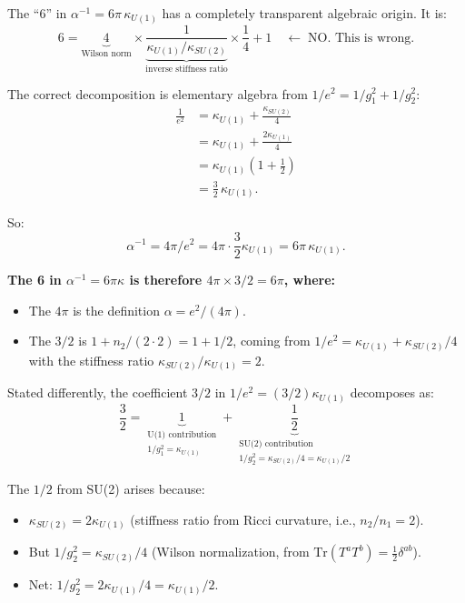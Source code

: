 \documentclass[11pt]{article}
\begin{document}
The ``6'' in $\alpha^{-1} = 6\pi\,\kappa_{U(1)}$ has a completely
transparent algebraic origin.  It is:
\begin{equation}
6 = \underbrace{4}_{\text{Wilson norm}}
    \times \underbrace{\frac{1}{\kappa_{U(1)}/\kappa_{SU(2)}}}_{\text{inverse
    stiffness ratio}}
    \times \frac{1}{4}
    + 1
    \quad\longleftarrow\;\text{NO.  This is wrong.}
\end{equation}

The correct decomposition is elementary algebra from
$1/e^2 = 1/g_1^2 + 1/g_2^2$:
\begin{align}
\frac{1}{e^2}
&= \kappa_{U(1)} + \frac{\kappa_{SU(2)}}{4} \nonumber\\
&= \kappa_{U(1)} + \frac{2\kappa_{U(1)}}{4} \nonumber\\
&= \kappa_{U(1)}\!\left(1 + \frac{1}{2}\right) \nonumber\\
&= \frac{3}{2}\,\kappa_{U(1)}.
\end{align}

So:
\[
\alpha^{-1} = 4\pi/e^2 = 4\pi \cdot \frac{3}{2}\kappa_{U(1)}
= 6\pi\,\kappa_{U(1)}.
\]

\textbf{The 6 in $\alpha^{-1} = 6\pi\kappa$ is therefore
$4\pi \times 3/2 = 6\pi$, where:}
\begin{itemize}
\item The $4\pi$ is the definition $\alpha = e^2/(4\pi)$.
\item The $3/2$ is $1 + n_2/(2\cdot 2) = 1 + 1/2$, coming from
      $1/e^2 = \kappa_{U(1)} + \kappa_{SU(2)}/4$ with the stiffness
      ratio $\kappa_{SU(2)}/\kappa_{U(1)} = 2$.
\end{itemize}

Stated differently, the coefficient $3/2$ in $1/e^2 = (3/2)\kappa_{U(1)}$
decomposes as:
\begin{equation}
\frac{3}{2} = \underbrace{1}_{\substack{\text{U(1) contribution}\\
  1/g_1^2 = \kappa_{U(1)}}}
+ \underbrace{\frac{1}{2}}_{\substack{\text{SU(2) contribution}\\
  1/g_2^2 = \kappa_{SU(2)}/4 = \kappa_{U(1)}/2}}
\end{equation}

The $1/2$ from SU(2) arises because:
\begin{itemize}
\item $\kappa_{SU(2)} = 2\kappa_{U(1)}$ (stiffness ratio from Ricci
      curvature, i.e., $n_2/n_1 = 2$).
\item But $1/g_2^2 = \kappa_{SU(2)}/4$ (Wilson normalization, from
      $\mathrm{Tr}(T^aT^b) = \tfrac12\delta^{ab}$).
\item Net: $1/g_2^2 = 2\kappa_{U(1)}/4 = \kappa_{U(1)}/2$.
\end{itemize}
\end{document}
